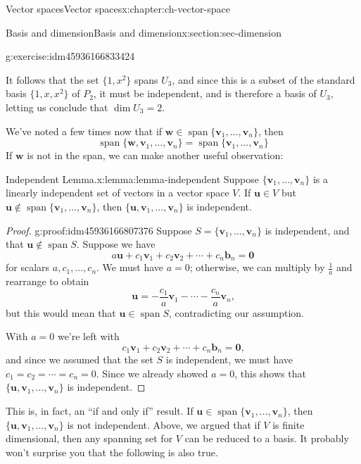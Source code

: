 \documentclass[oneside,10pt,]{book}
\numberwithin{equation}{section}
\newcommand{\spn}{\operatorname{span}}
\newcommand{\uu}{\mathbf{u}}
\newcommand{\vv}{\mathbf{v}}
\newcommand{\ww}{\mathbf{w}}
\begin{document}
\begin{chapterptx}{Vector spaces}{}{Vector spaces}{}{}{x:chapter:ch-vector-space}
\begin{sectionptx}{Basis and dimension}{}{Basis and dimension}{}{}{x:section:sec-dimension}
\begin{inlineexercise}{}{g:exercise:idm45936166833424}
\begin{enumerate}[label=\alph*]
\par
It follows that the set \(\{1,x^2\}\) spans \(U_3\), and since this is a subset of the standard basis \(\{1,x,x^2\}\) of \(P_2\), it must be independent, and is therefore a basis of \(U_3\), letting us conclude that \(\dim U_3=2\).%
\end{enumerate}
%
\end{inlineexercise}%
We've noted a few times now that if \(\ww\in\spn\{\vv_1,\ldots, \vv_n\}\), then%
\begin{equation*}
\spn\{\ww,\vv_1,\ldots, \vv_n\}=\spn\{\vv_1,\ldots, \vv_n\}
\end{equation*}
If \(\ww\) is not in the span, we can make another useful observation:%
\begin{lemma}{Independent Lemma.}{}{x:lemma:lemma-independent}%
Suppose \(\{\vv_1,\ldots, \vv_n\}\) is a linearly independent set of vectors in a vector space \(V\). If \(\uu\in V\) but \(\uu\notin \spn\{\vv_1,\ldots, \vv_n\}\), then \(\{\uu,\vv_1,\ldots, \vv_n\}\) is independent.%
\end{lemma}
\begin{proof}{}{g:proof:idm45936166807376}
Suppose \(S=\{\vv_1,\ldots, \vv_n\}\) is independent, and that \(\uu\notin\spn S\). Suppose we have%
\begin{equation*}
a\uu+c_1\vv_1+c_2\vv_2+\cdots +c_n\mathbf{b}_n=\mathbf{0}
\end{equation*}
for scalars \(a,c_1,\ldots, c_n\). We must have \(a=0\); otherwise, we can multiply by \(\frac1a\) and rearrange to obtain%
\begin{equation*}
\uu = -\frac{c_1}{a}\vv_1-\cdots -\frac{c_n}{a}\vv_n\text{,}
\end{equation*}
but this would mean that \(\uu\in \spn S\), contradicting our assumption.%
\par
With \(a=0\) we're left with%
\begin{equation*}
c_1\vv_1+c_2\vv_2+\cdots +c_n\mathbf{b}_n=\mathbf{0}\text{,}
\end{equation*}
and since we assumed that the set \(S\) is independent, we must have \(c_1=c_2=\cdots=c_n=0\). Since we already showed \(a=0\), this shows that \(\{\uu,\vv_1,\ldots, \vv_n\}\) is independent.%
\end{proof}
This is, in fact, an ``if and only if'' result. If \(\uu\in\spn\{\vv_1,\ldots, \vv_n\}\), then \(\{\uu,\vv_1,\ldots, \vv_n\}\) is not independent. Above, we argued that if \(V\) is finite dimensional, then any spanning set for \(V\) can be reduced to a basis. It probably won't surprise you that the following is also true.%

\end{sectionptx}
\end{chapterptx}
\end{document}
